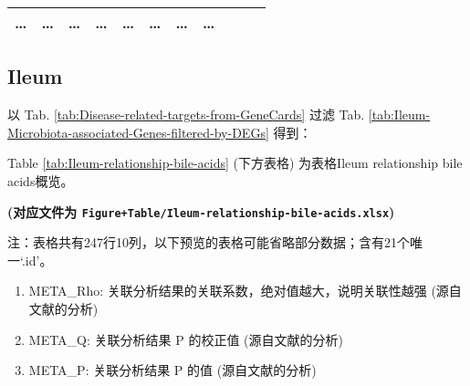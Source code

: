 \documentclass[
]{article}
\providecommand{\tightlist}{%
  \setlength{\itemsep}{0pt}\setlength{\parskip}{0pt}}
\begin{document}
\begin{longtable}[]{@{}lllllllllll@{}}
\begin{minipage}[t]{0.09\columnwidth}
\ldots{}\strut
\end{minipage} & \begin{minipage}[t]{0.07\columnwidth}\raggedright
\ldots{}\strut
\end{minipage} & \begin{minipage}[t]{0.07\columnwidth}\raggedright
\ldots{}\strut
\end{minipage} & \begin{minipage}[t]{0.09\columnwidth}\raggedright
\ldots{}\strut
\end{minipage} & \begin{minipage}[t]{0.07\columnwidth}\raggedright
\ldots{}\strut
\end{minipage} & \begin{minipage}[t]{0.07\columnwidth}\raggedright
\ldots{}\strut
\end{minipage} & \begin{minipage}[t]{0.07\columnwidth}\raggedright
\ldots{}\strut
\end{minipage} & \begin{minipage}[t]{0.03\columnwidth}\raggedright
\ldots{}\strut
\end{minipage}\tabularnewline
\bottomrule
\end{longtable}

\hypertarget{ileum2}{%
\subsection{Ileum}\label{ileum2}}

以 Tab. \ref{tab:Disease-related-targets-from-GeneCards} 过滤
Tab. \ref{tab:Ileum-Microbiota-associated-Genes-filtered-by-DEGs}
得到：

Table \ref{tab:Ileum-relationship-bile-acids} (下方表格) 为表格Ileum relationship bile acids概览。

\textbf{(对应文件为 \texttt{Figure+Table/Ileum-relationship-bile-acids.xlsx})}

\begin{center}\begin{tcolorbox}[colback=gray!10, colframe=gray!50, width=0.9\linewidth, arc=1mm, boxrule=0.5pt]注：表格共有247行10列，以下预览的表格可能省略部分数据；含有21个唯一`.id'。
\end{tcolorbox}
\end{center}
\begin{center}\begin{tcolorbox}[colback=gray!10, colframe=gray!50, width=0.9\linewidth, arc=1mm, boxrule=0.5pt]\begin{enumerate}\tightlist
\item META\_Rho:  关联分析结果的关联系数，绝对值越大，说明关联性越强 (源自文献的分析)
\item META\_Q:  关联分析结果 P 的校正值 (源自文献的分析)
\item META\_P:  关联分析结果 P 的值 (源自文献的分析)
\end{enumerate}\end{tcolorbox}
\end{center}
\end{document}
